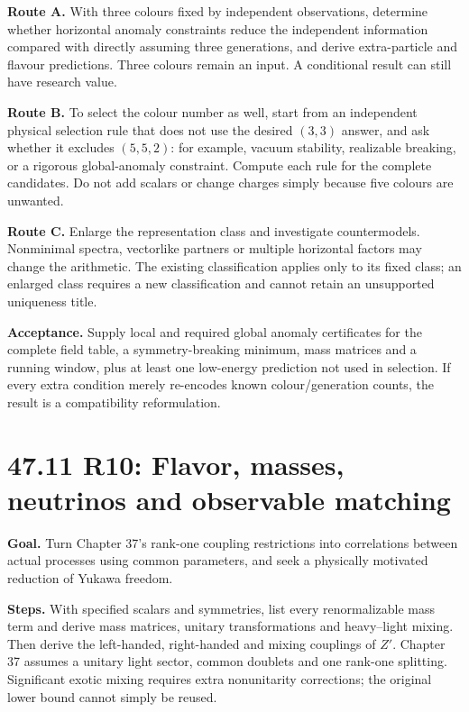 \documentclass[
  11pt,
  oneside]{book}
\begin{document}
\textbf{Route A.} With three colours fixed by independent observations,
determine whether horizontal anomaly constraints reduce the independent
information compared with directly assuming three generations, and
derive extra-particle and flavour predictions. Three colours remain an
input. A conditional result can still have research value.

\textbf{Route B.} To select the colour number as well, start from an
independent physical selection rule that does not use the desired
\((3,3)\) answer, and ask whether it excludes \((5,5,2)\): for example,
vacuum stability, realizable breaking, or a rigorous global-anomaly
constraint. Compute each rule for the complete candidates. Do not add
scalars or change charges simply because five colours are unwanted.

\textbf{Route C.} Enlarge the representation class and investigate
countermodels. Nonminimal spectra, vectorlike partners or multiple
horizontal factors may change the arithmetic. The existing
classification applies only to its fixed class; an enlarged class
requires a new classification and cannot retain an unsupported
uniqueness title.

\textbf{Acceptance.} Supply local and required global anomaly
certificates for the complete field table, a symmetry-breaking minimum,
mass matrices and a running window, plus at least one low-energy
prediction not used in selection. If every extra condition merely
re-encodes known colour/generation counts, the result is a compatibility
reformulation.

\section{47.11 R10: Flavor, masses, neutrinos and observable matching}

\textbf{Goal.} Turn Chapter 37's rank-one coupling restrictions into
correlations between actual processes using common parameters, and seek
a physically motivated reduction of Yukawa freedom.

\textbf{Steps.} With specified scalars and symmetries, list every
renormalizable mass term and derive mass matrices, unitary
transformations and heavy--light mixing. Then derive the left-handed,
right-handed and mixing couplings of \(Z'\). Chapter 37 assumes a
unitary light sector, common doublets and one rank-one splitting.
Significant exotic mixing requires extra nonunitarity corrections; the
original lower bound cannot simply be reused.
\end{document}
